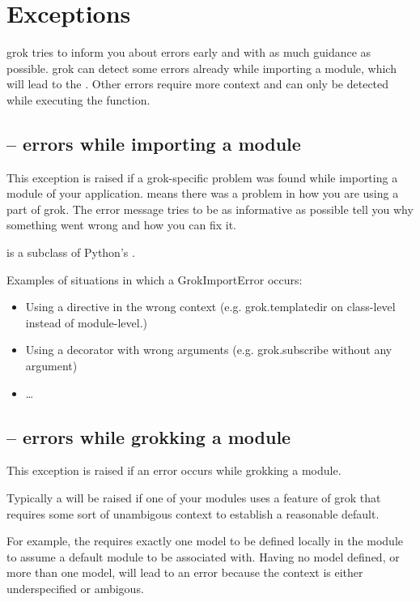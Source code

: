 \chapter{Exceptions}

grok tries to inform you about errors early and with as much guidance as
possible. grok can detect some errors already while importing a module, which
will lead to the .  Other errors require more context
and can only be detected while executing the  function.

    \section{ -- errors while importing a module}

    This exception is raised if a grok-specific problem was found while
    importing a module of your application.  means there
    was a problem in how you are using a part of grok. The error message tries
    to be as informative as possible tell you why something went wrong and how
    you can fix it.

     is a subclass of Python's .

    Examples of situations in which a GrokImportError occurs:

    \begin{itemize}
        \item Using a directive in the wrong context (e.g. grok.templatedir on
        class-level instead of module-level.)
        \item Using a decorator with wrong arguments (e.g. grok.subscribe
        without any argument)
        \item \ldots
    \end{itemize}

    \section{ -- errors while grokking a module}

    This exception is raised if an error occurs while grokking a module.

    Typically a  will be raised if one of your modules uses a
    feature of grok that requires some sort of unambigous context to establish
    a reasonable default.

    For example, the  requires exactly one model to be defined
    locally in the module to assume a default module to be associated with.
    Having no model defined, or more than one model, will lead to an error
    because the context is either underspecified or ambigous.

